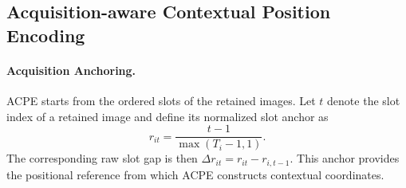 \subsection{Acquisition-aware Contextual Position Encoding}
\label{sec:acpe}

\paragraph{Acquisition Anchoring.}
ACPE starts from the ordered slots of the retained images.  Let $t$ denote the
slot index of a retained image and define its normalized slot anchor as
\begin{equation}
r_{it}=\frac{t-1}{\max(T_i-1,1)}.
\label{eq:acpe_anchor_new}
\end{equation}
The corresponding raw slot gap is then
$\Delta r_{it}=r_{it}-r_{i,t-1}$.  This anchor provides the positional
reference from which ACPE constructs contextual coordinates.



